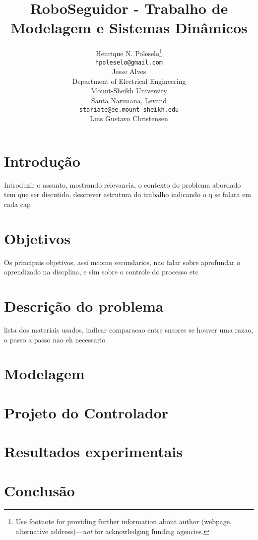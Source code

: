 \documentclass{article}
\title{RoboSeguidor - Trabalho de Modelagem e Sistemas Dinâmicos}
\author{
  Henrique N. Poleselo\thanks{Use footnote for providing further
    information about author (webpage, alternative
    address)---\emph{not} for acknowledging funding agencies.} \\
  \texttt{hpoleselo@gmail.com} \\
   \And
 Jesse Alves \\
  Department of Electrical Engineering\\
  Mount-Sheikh University\\
  Santa Narimana, Levand \\
  \texttt{stariate@ee.mount-sheikh.edu} \\
  \And
  Luis Gustavo Christensen
}
\begin{document}
\maketitle


\section{Introdução}
Introduzir o assunto, mostrando relevancia, o contexto do problema abordado tem que ser discutido, descrever estrutura do trabalho indicando o q se falara em cada cap

\section{Objetivos}
Os principais objetivos, assi mcomo secundarios, nao falar sobre aprofundar o aprendizado na discplina, e sim sobre o controle do processo etc

\section{Descrição do problema}
lista dos materiais usados, indicar comparacao entre snsores se houver uma razao, o passo a passo nao eh necessario

\section{Modelagem}


\section{Projeto do Controlador}

\section{Resultados experimentais}

\section{Conclusão}
\end{document}
